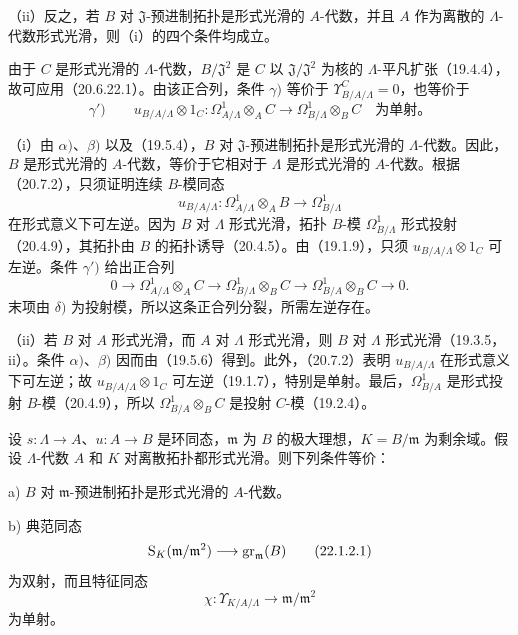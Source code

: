 （ii）反之，若 $B$ 对 $\mathfrak J$-预进制拓扑是形式光滑的 $A$-代数，并且 $A$ 作为离散的 $\Lambda$-代数形式光滑，则（i）的四个条件均成立。

\eproof
由于 $C$ 是形式光滑的 $\Lambda$-代数，$B/\mathfrak J^2$ 是 $C$ 以 $\mathfrak J/\mathfrak J^2$ 为核的 $\Lambda$-平凡扩张（19.4.4），故可应用（20.6.22.1）。由该正合列，条件 $\gamma)$ 等价于 $\Upsilon^C_{B/A/\Lambda}=0$，也等价于
\[
 \gamma')\qquad
 u_{B/A/\Lambda}\otimes1_C:
 \Omega^1_{A/\Lambda}\otimes_A C
 \longrightarrow\Omega^1_{B/\Lambda}\otimes_B C
 \quad\text{为单射。}
\]

（i）由 $\alpha)$、$\beta)$ 以及（19.5.4），$B$ 对 $\mathfrak J$-预进制拓扑是形式光滑的 $\Lambda$-代数。因此，$B$ 是形式光滑的 $A$-代数，等价于它相对于 $\Lambda$ 是形式光滑的 $A$-代数。根据（20.7.2），只须证明连续 $B$-模同态
\[
 u_{B/A/\Lambda}:\Omega^1_{A/\Lambda}\otimes_A B
 \longrightarrow\Omega^1_{B/\Lambda}
\]
在形式意义下可左逆。因为 $B$ 对 $\Lambda$ 形式光滑，拓扑 $B$-模 $\Omega^1_{B/\Lambda}$ 形式投射（20.4.9），其拓扑由 $B$ 的拓扑诱导（20.4.5）。由（19.1.9），只须 $u_{B/A/\Lambda}\otimes1_C$ 可左逆。条件 $\gamma')$ 给出正合列
\[
 0\longrightarrow\Omega^1_{A/\Lambda}\otimes_A C
 \longrightarrow\Omega^1_{B/\Lambda}\otimes_B C
 \longrightarrow\Omega^1_{B/A}\otimes_B C\longrightarrow0.
\]
末项由 $\delta)$ 为投射模，所以这条正合列分裂，所需左逆存在。

（ii）若 $B$ 对 $A$ 形式光滑，而 $A$ 对 $\Lambda$ 形式光滑，则 $B$ 对 $\Lambda$ 形式光滑（19.3.5，ii）。条件 $\alpha)$、$\beta)$ 因而由（19.5.6）得到。此外，（20.7.2）表明 $u_{B/A/\Lambda}$ 在形式意义下可左逆；故 $u_{B/A/\Lambda}\otimes1_C$ 可左逆（19.1.7），特别是单射。最后，$\Omega^1_{B/A}$ 是形式投射 $B$-模（20.4.9），所以 $\Omega^1_{B/A}\otimes_B C$ 是投射 $C$-模（19.2.4）。
\finishproof

设 $s:\Lambda\to A$、$u:A\to B$ 是环同态，$\mathfrak m$ 为 $B$ 的极大理想，$K=B/\mathfrak m$ 为剩余域。假设 $\Lambda$-代数 $A$ 和 $K$ 对离散拓扑都形式光滑。则下列条件等价：

\noindent a) $B$ 对 $\mathfrak m$-预进制拓扑是形式光滑的 $A$-代数。

\noindent b) 典范同态
\begin{equation}
 \mathrm S_K(\mathfrak m/\mathfrak m^2)
 \longrightarrow\operatorname{gr}_{\mathfrak m}(B)
 \tag{22.1.2.1}
\end{equation}
为双射，而且特征同态
\begin{equation}
 \chi:\Upsilon_{K/A/\Lambda}\longrightarrow\mathfrak m/\mathfrak m^2
 \tag{22.1.2.2}
\end{equation}
为单射。

